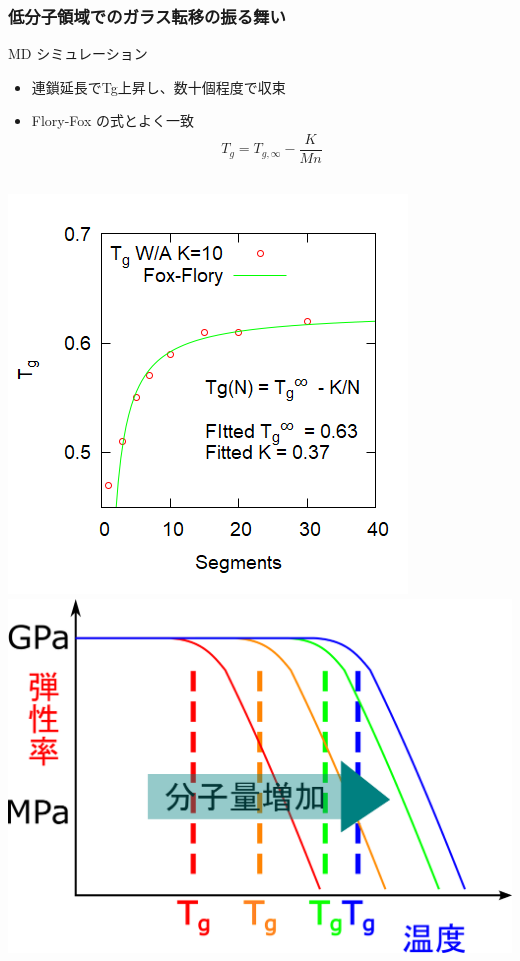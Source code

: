 \documentclass[12pt, dvipdfmx]{beamer}
\begin{document}
\begin{frame}
	\frametitle{低分子領域でのガラス転移の振る舞い}
		\begin{block}{MD シミュレーション}
			\begin{itemize}
				\item 連鎖延長でTg上昇し、数十個程度で収束
				\item Flory-Fox の式とよく一致
				\vspace{-1\baselineskip}
					\begin{align*}
						T_g = T_{g,\infty} - \dfrac{K}{Mn}
					\end{align*}
			\end{itemize}
			\vspace{-1\baselineskip}
		\begin{columns}[c, onlytextwidth]
				\centering
				\includegraphics[width=.8\textwidth]{Tg_N_inv.png}
				\centering
				\includegraphics[width=\textwidth]{polymer_spectrum_1.png}
		\end{columns}
	\end{block}
\end{frame}
\end{document}
